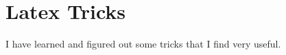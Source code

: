 
\chapter{Latex Tricks}
\label{chapter:tricks}

\thispagestyle{empty}

I have learned and figured out some tricks that I find very useful.


\minitoc
\newpage



